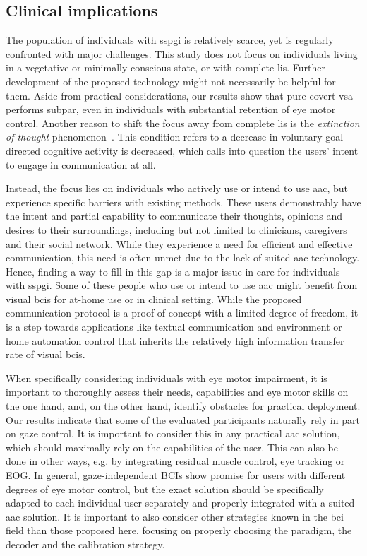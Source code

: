 \documentclass{article}
\begin{document}
\subsection{Clinical implications}
The population of individuals with \ac{sspgi} is relatively scarce, yet is regularly
confronted with major challenges.
This study does not focus on individuals living in a vegetative or minimally
conscious state, or with complete \ac{lis}.
Further development of the proposed technology might not necessarily
be helpful for them.
Aside from practical considerations, our results show that pure covert \ac{vsa}
performs subpar, even in individuals with substantial retention of eye motor
control.
Another reason to shift the focus away from complete \ac{lis} is the
\textit{extinction of thought} phenomenon~\cite{Kuebler2008}.
This condition refers to a decrease in voluntary goal-directed cognitive
activity is decreased, which calls into question the users' intent to engage in
communication at all.

Instead, the focus lies  on individuals who actively use or intend to use \ac{aac},
but experience specific barriers with existing methods.
These users demonstrably have the intent and partial capability to communicate
their thoughts, opinions and desires to their surroundings, including but not
limited to clinicians, caregivers and their social network.
While they experience a need for efficient and effective communication,
this need is often unmet due to the lack of suited \ac{aac} technology.
Hence, finding a way to fill in this gap is a major issue in care for
individuals with \ac{sspgi}.
Some of these people who use or intend to use \ac{aac} might benefit
from visual \acp{bci} for at-home use or in clinical setting.
While the proposed communication protocol is a proof of concept with a limited degree
of freedom, it is a step towards applications like textual communication and
environment or home automation control that inherits the relatively high
information transfer rate of visual \acp{bci}.

When specifically considering individuals with eye motor impairment, it is important to
thoroughly assess their needs, capabilities and eye motor skills
on the one hand, and, on the other hand, identify obstacles for practical deployment.
Our results indicate that some of the evaluated participants naturally rely
in part on gaze control.
It is important to consider this in any practical \ac{aac} solution, which should
maximally rely on the capabilities of the user.
This can also be done in other ways, e.g. by integrating
residual muscle control, eye tracking or EOG.
In general, gaze-independent BCIs show promise for users with different degrees of eye
motor control, but the exact solution should
be specifically adapted to each individual user separately and properly
integrated with a suited \ac{aac} solution.
It is important to also consider other strategies known in
the \ac{bci} field than those proposed here, focusing on properly choosing
the paradigm, the decoder and the calibration strategy.
\end{document}
